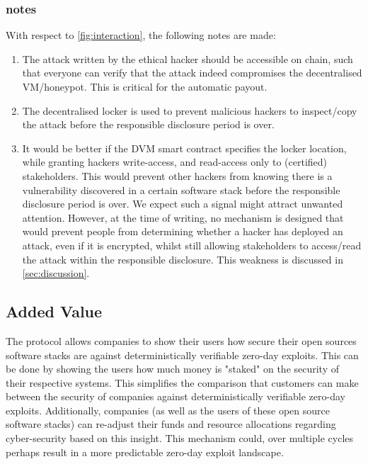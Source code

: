 \subsubsection{ notes}
With respect to \cref{fig:interaction}, the following notes are made:
\begin{enumerate} 
    \item The attack written by the ethical hacker should be accessible on chain, such that everyone can verify that the attack indeed compromises the decentralised VM/honeypot. This is critical for the automatic payout.
    \item The decentralised locker is used to prevent malicious hackers to inspect/copy the attack before the responsible disclosure period is over.
    \item It would be better if the DVM smart contract specifies the locker location, while granting hackers write-access, and read-access only to (certified) stakeholders. This would prevent other hackers from knowing there is a vulnerability discovered in a certain software stack before the responsible disclosure period is over. We expect such a signal might attract unwanted attention. However, at the time of writing, no mechanism is designed that would prevent people from determining whether a hacker has deployed an attack, even if it is encrypted, whilst still allowing stakeholders to access/read the attack within the responsible disclosure. This weakness is discussed in \cref{sec:discussion}.
\end{enumerate}

\subsection{Added Value}
The protocol allows companies to show their users how secure their open sources software stacks are against deterministically verifiable zero-day exploits. This can be done by showing the users how much money is "staked" on the security of their respective systems. This simplifies the comparison that customers can make between the security of companies against deterministically verifiable zero-day exploits. Additionally, companies (as well as the users of these open source software stacks) can re-adjust their funds and resource allocations regarding cyber-security based on this insight. This mechanism could, over multiple cycles perhaps result in a more predictable zero-day exploit landscape.